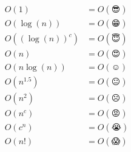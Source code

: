 \documentclass[preview]{standalone}
\begin{document}
\begin{align*}
O(1)           &= O(😎) \\
O(\log(n))     &= O(😁) \\
O((\log(n))^c) &= O(😇) \\
O(n)           &= O(😍) \\
O(n \log(n))   &= O(☺️) \\
O(n^{1.5})     &= O(😐) \\
O(n^2)         &= O(☹️) \\
O(n^c)         &= O(😡) \\
O(c^n)         &= O(😭) \\
O(n!)          &= O(😱) \\
\end{align*}
\end{document}
